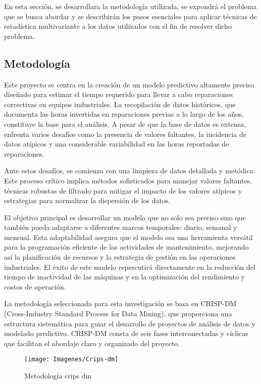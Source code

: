 \documentclass[
  11pt,
  bookmarksnumbered]{article}
\begin{document}
En esta sección, se desarrollara la metodología utilizada, se expondrá el problema que se busca abordar y se describirán los pasos esenciales para aplicar técnicas de estadística multivariante a los datos utilizados con el fin de resolver dicho problema.

\hypertarget{metodologuxeda}{%
\subsection{Metodología}\label{metodologuxeda}}

Este proyecto se centra en la creación de un modelo predictivo altamente preciso diseñado para estimar el tiempo requerido para llevar a cabo reparaciones correctivas en equipos industriales.
La recopilación de datos históricos, que documenta las horas invertidas en reparaciones previas a lo largo de los años, constituye la base para el análisis.
A pesar de que la base de datos es extensa, enfrenta varios desafíos como la presencia de valores faltantes, la incidencia de datos atípicos y una considerable variabilidad en las horas reportadas de reparaciones.

Ante estos desafíos, se comienza con una limpieza de datos detallada y metódica.
Este proceso crítico implica métodos sofisticados para manejar valores faltantes, técnicas robustas de filtrado para mitigar el impacto de los valores atípicos y estrategias para normalizar la dispersión de los datos.

El objetivo principal es desarrollar un modelo que no solo sea preciso sino que también pueda adaptarse a diferentes marcos temporales: diario, semanal y mensual.
Esta adaptabilidad asegura que el modelo sea una herramienta versátil para la programación eficiente de las actividades de mantenimiento, mejorando así la planificación de recursos y la estrategia de gestión en las operaciones industriales.
El éxito de este modelo repercutirá directamente en la reducción del tiempo de inactividad de las máquinas y en la optimización del rendimiento y costos de operación.

La metodología seleccionada para esta investigación se basa en CRISP-DM (Cross-Industry Standard Process for Data Mining), que proporciona una estructura sistemática para guiar el desarrollo de proyectos de análisis de datos y modelado predictivo.
CRISP-DM consta de seis fases interconectadas y cíclicas que facilitan el abordaje claro y organizado del proyecto.

\begin{figure}

{\centering \texttt{[image: Imagenes/Crips-dm]} 

}

\caption{Metodología crips dm}\label{fig:unnamed-chunk-4}
\end{figure}
\end{document}
